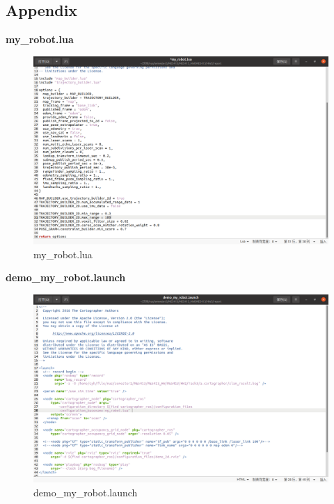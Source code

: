 \documentclass[hyperref]{article}
\theoremstyle{nonumberplain}
\begin{document}
\begin{appendices}
	
	\section{Appendix}
	
	\textbf{\textcolor[rgb]{0.98,0.00,0.00}{my\_robot.lua}}
	\begin{figure}[H]
		\centering
		\includegraphics[width=18cm]{appendix2.png}
		\caption{my\_robot.lua}
		\label{fig10}
	\end{figure} 
	
	\newpage

	
	\textbf{\textcolor[rgb]{0.98,0.00,0.00}{demo\_my\_robot.launch}}
	
	\begin{figure}[H]
		\centering
			\includegraphics[width=18cm]{appendix1.png}
		\caption{demo\_my\_robot.launch}
		\label{fig11}
	\end{figure} 
	

\end{appendices}
\end{document}
